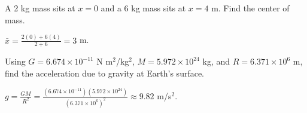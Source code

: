 \begin{Exercise}[label=mw2, title={Center of mass}]
A 2 kg mass sits at $x = 0$ and a 6 kg mass sits at $x = 4$ m. Find the center of mass.
\end{Exercise}
\begin{Answer}[ref=mw2]
$\bar{x} = \frac{2(0) + 6(4)}{2 + 6} = 3$ m.
\end{Answer}

\begin{Exercise}[label=mw3, title={Surface gravity}]
Using $G = 6.674 \times 10^{-11}$ N m$^2$/kg$^2$, $M = 5.972 \times 10^{24}$ kg, and $R = 6.371 \times 10^6$ m, find the acceleration due to gravity at Earth's surface.
\end{Exercise}
\begin{Answer}[ref=mw3]
$g = \frac{GM}{R^2} = \frac{(6.674 \times 10^{-11})(5.972 \times 10^{24})}{(6.371 \times 10^6)^2} \approx 9.82$ m/s$^2$.
\end{Answer}
